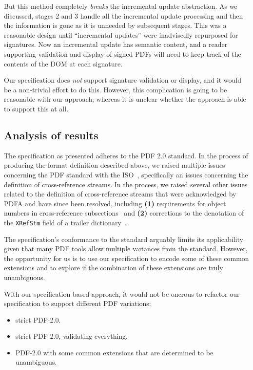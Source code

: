 But this method completely \emph{breaks} the incremental update
abstraction.  As we discussed, stages 2 and 3 handle all
the incremental update processing and then the information is gone as
it is unneeded by subsequent stages.
% 
This was a reasonable design until ``incremental updates'' were
inadvisedly repurposed for signatures.  Now an incremental update has
semantic content, and a reader supporting validation and display of
signed PDFs will need to keep track of the contents of the DOM at each
signature.

Our specification does \emph{not} support signature validation or
display, and it would be a non-trivial effort to do this.  However,
this complication is going to be reasonable with our \ssp{} approach;
whereas it is unclear whether the \dsp{} approach is able to support
this at all.


\subsection{Analysis of results}
\label{sec:results-analysis}

The specification as presented adheres to the PDF 2.0 standard.
In the process of producing the format definition described above, we
raised multiple issues concerning the PDF standard with the
ISO~\cite{isotc171sc2wg8ISO32000220202020}, specifically an issues
concerning the definition of cross-reference streams.
%
In the process, we raised several other issues related to the
definition of cross-reference streams that were acknowledged by PDFA
and have since been resolved, including %
\textbf{(1)} requirements for object numbers in cross-reference
subsections~\cite{pdfIssue146} and %
\textbf{(2)} corrections to the denotation of the \texttt{XRefStm}
field of a trailer dictionary~\cite{pdfIssue147}.


The specification's conformance to the standard arguably
limits its applicability given that many PDF tools allow multiple
variances from the standard.
%
However, the opportunity for us is to use our specification to encode
some of these common extensions and to explore if the combination of
these extensions are truly unambiguous.

With our specification based approach, it would not be onerous
to refactor our specification to support different PDF variations:
\begin{itemize}
\item strict PDF-2.0.
\item strict PDF-2.0, validating everything.
\item PDF-2.0 with some common extensions that are determined to be unambiguous.
\end{itemize}
%

